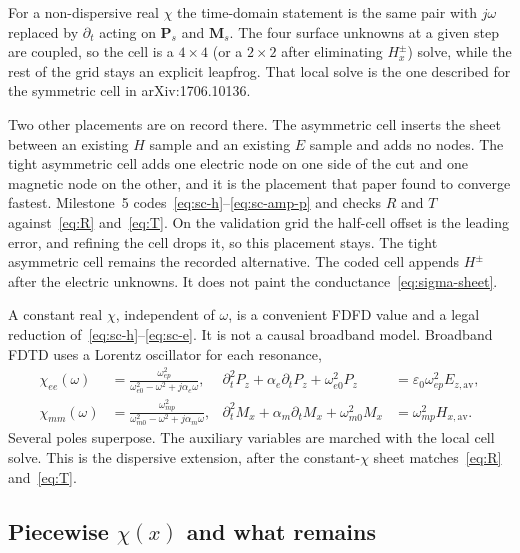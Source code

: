 \documentclass[11pt,a4paper]{article}
\numberwithin{equation}{section}
\begin{document}
For a non-dispersive real $\chi$ the time-domain statement is the same pair
with $j\omega$ replaced by $\partial_t$ acting on $\mathbf{P}_s$ and
$\mathbf{M}_s$. The four surface unknowns at a given step are coupled, so the
cell is a $4\times 4$ (or a $2\times 2$ after eliminating $H_x^\pm$) solve,
while the rest of the grid stays an explicit leapfrog. That local solve is
the one described for the symmetric cell in arXiv:1706.10136.

Two other placements are on record there. The asymmetric cell inserts the
sheet between an existing $H$ sample and an existing $E$ sample and adds no
nodes. The tight asymmetric cell adds one electric node on one side of the
cut and one magnetic node on the other, and it is the placement that paper
found to converge fastest. Milestone~5 codes~\eqref{eq:sc-h}--\eqref{eq:sc-amp-p}
and checks $R$ and $T$ against~\eqref{eq:R} and~\eqref{eq:T}. On the
validation grid the half-cell offset is the leading error, and refining
the cell drops it, so this placement stays. The tight asymmetric cell
remains the recorded alternative. The coded cell appends $H^\pm$ after
the electric unknowns. It does not paint the conductance~\eqref{eq:sigma-sheet}.

A constant real $\chi$, independent of $\omega$, is a convenient FDFD value
and a legal reduction of~\eqref{eq:sc-h}--\eqref{eq:sc-e}. It is not a causal
broadband model. Broadband FDTD uses a Lorentz oscillator for each resonance,
\begin{align}
\chi_{ee}(\omega) &= \frac{\omega_{ep}^2}{\omega_{e0}^2-\omega^2+j\alpha_e\omega},
&
\partial_t^2 P_z + \alpha_e\partial_t P_z + \omega_{e0}^2 P_z
&= \varepsilon_0\omega_{ep}^2 E_{z,\mathrm{av}},
\label{eq:lorentz-e}\\
\chi_{mm}(\omega) &= \frac{\omega_{mp}^2}{\omega_{m0}^2-\omega^2+j\alpha_m\omega},
&
\partial_t^2 M_x + \alpha_m\partial_t M_x + \omega_{m0}^2 M_x
&= \omega_{mp}^2 H_{x,\mathrm{av}}.
\label{eq:lorentz-m}
\end{align}
Several poles superpose. The auxiliary variables are marched with the local
cell solve. This is the dispersive extension, after the constant-$\chi$ sheet
matches~\eqref{eq:R} and~\eqref{eq:T}.

\subsection{Piecewise $\chi(x)$ and what remains}
\label{sec:gstc-later}
\end{document}
